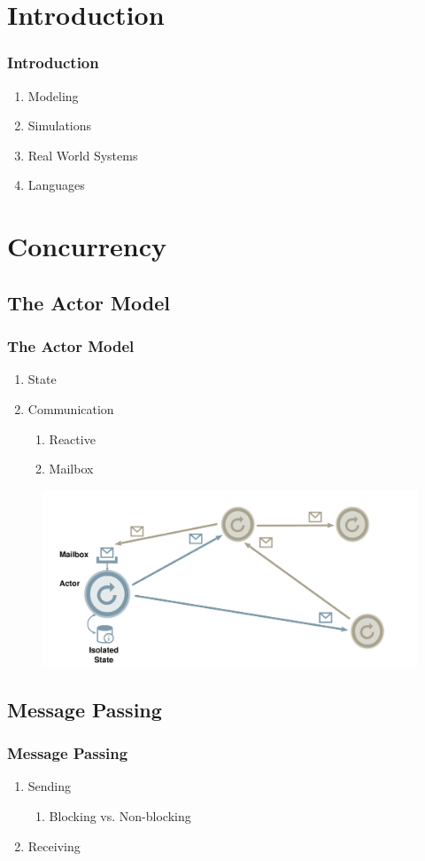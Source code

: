 \section{Introduction}
\begin{frame}
  \frametitle{Introduction}
  \begin{enumerate}
    \item Modeling
    \item Simulations
    \item Real World Systems
    \item Languages
  \end{enumerate}
\end{frame}

\section{Concurrency}
\subsection{The Actor Model}
\begin{frame}
  \frametitle{The Actor Model}
  \begin{enumerate}
    \item State
    \item Communication
    \begin{enumerate}
      \item Reactive
      \item Mailbox
    \end{enumerate}
  \end{enumerate}
  \begin{figure}[htbp]
  \centering
  \includegraphics[width=\textwidth]{Images/actors.pdf}
\end{figure}
\end{frame}

\subsection{Message Passing}
\begin{frame}
  \frametitle{Message Passing}
  \begin{enumerate}
    \item Sending
    \begin{enumerate}
      \item Blocking vs. Non-blocking
    \end{enumerate}
    \item Receiving
  \end{enumerate}
\end{frame}
